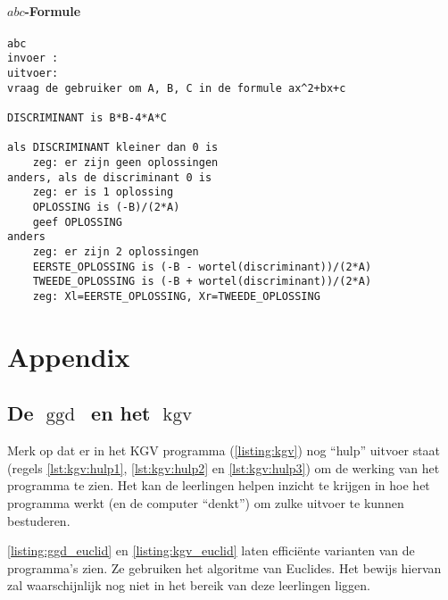 \documentclass[a4paper,notitlepage]{report}
\newcommand\ggd{\ensuremath{\operatorname{ggd}}}
\newcommand\kgv{\ensuremath{\operatorname{kgv}}}
\renewcommand{\thesection}{\arabic{section}}
\begin{document}
\subsubsection{$abc$-Formule}
\begin{lstlisting}[language=pseudo, caption={Pseudocode voor $abc$-formule}, label={pseudo:abc}]
abc
invoer : 
uitvoer: 
vraag de gebruiker om A, B, C in de formule ax^2+bx+c

DISCRIMINANT is B*B-4*A*C

als DISCRIMINANT kleiner dan 0 is
	zeg: er zijn geen oplossingen
anders, als de discriminant 0 is
	zeg: er is 1 oplossing
	OPLOSSING is (-B)/(2*A)
	geef OPLOSSING
anders
	zeg: er zijn 2 oplossingen
	EERSTE_OPLOSSING is (-B - wortel(discriminant))/(2*A)
	TWEEDE_OPLOSSING is (-B + wortel(discriminant))/(2*A)
	zeg: Xl=EERSTE_OPLOSSING, Xr=TWEEDE_OPLOSSING
\end{lstlisting}

\appendix\setlength{\parindent}{0mm}
\chapter*{Appendix}
\renewcommand{\thesection}{\Alph{section}}
\section{De \ggd\ en het \kgv}




Merk op dat er in het KGV programma (\autoref{listing:kgv}) nog ``hulp'' uitvoer staat (regels \ref{lst:kgv:hulp1}, \ref{lst:kgv:hulp2} en \ref{lst:kgv:hulp3}) om de werking van het programma te zien. Het kan de leerlingen helpen inzicht te krijgen in hoe het programma werkt (en de computer ``denkt'') om zulke uitvoer te kunnen bestuderen.



\autoref{listing:ggd_euclid} en \autoref{listing:kgv_euclid} laten effici\"{e}nte varianten van de programma's zien. Ze gebruiken het algoritme van Euclides. Het bewijs hiervan zal waarschijnlijk nog niet in het bereik van deze leerlingen liggen.
\end{document}
